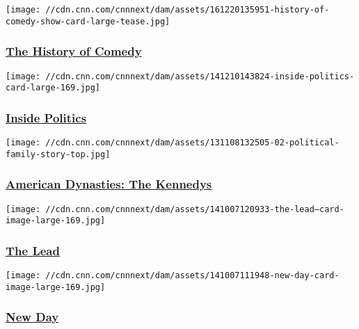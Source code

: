 \href{/shows/history-of-comedy}{}

\texttt{[image: //cdn.cnn.com/cnnnext/dam/assets/161220135951-history-of-comedy-show-card-large-tease.jpg]}

\hypertarget{the-history-of-comedy}{%
\subsubsection{\texorpdfstring{\href{/shows/history-of-comedy}{The
History of
Comedy}}{The History of Comedy}}\label{the-history-of-comedy}}

\href{/shows/inside-politics}{}

\texttt{[image: //cdn.cnn.com/cnnnext/dam/assets/141210143824-inside-politics-card-large-169.jpg]}

\hypertarget{inside-politics}{%
\subsubsection{\texorpdfstring{\href{/shows/inside-politics}{Inside
Politics}}{Inside Politics}}\label{inside-politics}}

\href{/shows/the-kennedys-american-dynasties}{}

\texttt{[image: //cdn.cnn.com/cnnnext/dam/assets/131108132505-02-political-family-story-top.jpg]}

\hypertarget{american-dynasties-the-kennedys}{%
\subsubsection{\texorpdfstring{\href{/shows/the-kennedys-american-dynasties}{American
Dynasties: The
Kennedys}}{American Dynasties: The Kennedys}}\label{american-dynasties-the-kennedys}}

\href{/shows/the-lead}{}

\texttt{[image: //cdn.cnn.com/cnnnext/dam/assets/141007120933-the-lead---card-image-large-169.jpg]}

\hypertarget{the-lead}{%
\subsubsection{\texorpdfstring{\href{/shows/the-lead}{The
Lead}}{The Lead}}\label{the-lead}}

\href{/shows/new-day}{}

\texttt{[image: //cdn.cnn.com/cnnnext/dam/assets/141007111948-new-day-card-image-large-169.jpg]}

\hypertarget{new-day}{%
\subsubsection{\texorpdfstring{\href{/shows/new-day}{New
Day}}{New Day}}\label{new-day}}

